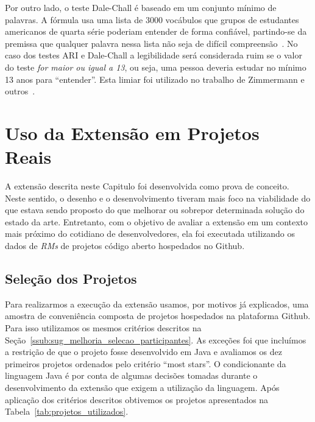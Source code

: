 Por outro lado, o teste Dale-Chall é baseado em um conjunto mínimo de palavras.
A fórmula usa uma lista de 3000 vocábulos que grupos de estudantes americanos de
quarta série poderiam entender de forma confiável, partindo-se da premissa que
qualquer palavra nessa lista não seja de difícil
compreensão~\cite{dale1948formula}. No caso dos testes ARI e Dale-Chall a
legibilidade será considerada ruim se o valor do teste \textit{for maior ou
    igual a 13}, ou seja, uma pessoa deveria estudar no mínimo 13 anos para
``entender''. Esta limiar foi utilizado no trabalho de Zimmermann e
outros~\cite{zimmermann2010makes}.

\section{Uso da Extensão em Projetos Reais}
\label{sec:avaliando_a_extensao_proposta}

A extensão descrita neste Capitulo foi desenvolvida como prova de conceito.
Neste sentido, o desenho e o desenvolvimento tiveram mais foco na viabilidade do
que estava sendo proposto do que melhorar ou sobrepor determinada solução do
estado da arte. Entretanto, com o objetivo de avaliar a extensão em um contexto
mais próximo do cotidiano de desenvolvedores, ela foi executada utilizando os
dados de \textit{RMs} de projetos código aberto hospedados no Github.

\subsection{Seleção dos Projetos}
\label{sub:implementacao_selecao_projetos}

Para realizarmos a execução da extensão usamos, por motivos já explicados, uma
amostra de conveniência composta de projetos hospedados na plataforma Github.
Para isso utilizamos os mesmos critérios descritos na
Seção~\ref{ssub:sug_melhoria_selecao_participantes}. As exceções foi que
incluímos a restrição de que o projeto fosse desenvolvido em Java e avaliamos os
dez primeiros projetos ordenados pelo critério ``most stars''. O condicionante
da linguagem Java é por conta de algumas decisões tomadas durante o
desenvolvimento da extensão que exigem a utilização da linguagem. Após aplicação
dos critérios descritos obtivemos os projetos apresentados na
Tabela~\ref{tab:projetos_utilizados}.

\begin{table}[htpb]
\centering
{}
\caption{Projetos utilizados no testes de execução da extensão. Os dados
    apresentados têm como referência 23/04/2017.}
\label{tab:projetos_utilizados}
\end{table}

